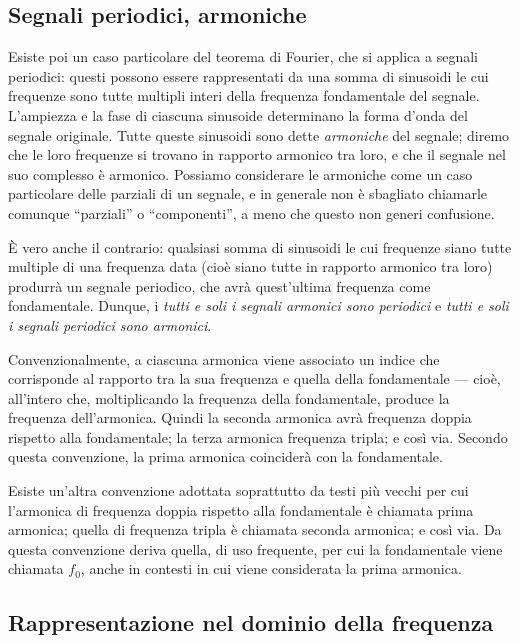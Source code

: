 \documentclass[11pt]{report}
\begin{document}
\subsection{Segnali periodici, armoniche}

Esiste poi un caso particolare del teorema di Fourier, che si applica a segnali periodici: questi possono essere rappresentati da una somma di sinusoidi le cui frequenze sono tutte multipli interi della frequenza fondamentale del segnale. L'ampiezza e la fase di ciascuna sinusoide determinano la forma d'onda del segnale originale. Tutte queste sinusoidi sono dette \emph{armoniche} del segnale; diremo che le loro frequenze si trovano in rapporto armonico tra loro, e che il segnale nel suo complesso è armonico. Possiamo considerare le armoniche come un caso particolare delle parziali di un segnale, e in generale non è sbagliato chiamarle comunque ``parziali'' o ``componenti'', a meno che questo non generi confusione.

È vero anche il contrario: qualsiasi somma di sinusoidi le cui frequenze siano tutte multiple di una frequenza data (cioè siano tutte in rapporto armonico tra loro) produrrà un segnale periodico, che avrà quest'ultima frequenza come fondamentale. Dunque, i \emph{tutti e soli i segnali armonici sono periodici} e \emph{tutti e soli i segnali periodici sono armonici}.

Convenzionalmente, a ciascuna armonica viene associato un indice che corrisponde al rapporto tra la sua frequenza e quella della fondamentale --- cioè, all'intero che, moltiplicando la frequenza della fondamentale, produce la frequenza dell'armonica. Quindi la seconda armonica avrà frequenza doppia rispetto alla fondamentale; la terza armonica frequenza tripla; e così via. Secondo questa convenzione, la prima armonica coinciderà con la fondamentale.

Esiste un'altra convenzione adottata soprattutto da testi più vecchi per cui l'armonica di frequenza doppia rispetto alla fondamentale è chiamata prima armonica; quella di frequenza tripla è chiamata seconda armonica; e così via. Da questa convenzione deriva quella, di uso frequente, per cui la fondamentale viene chiamata $f_0$, anche in contesti in cui viene considerata la prima armonica.




\subsection{Rappresentazione nel dominio della frequenza}
\end{document}
